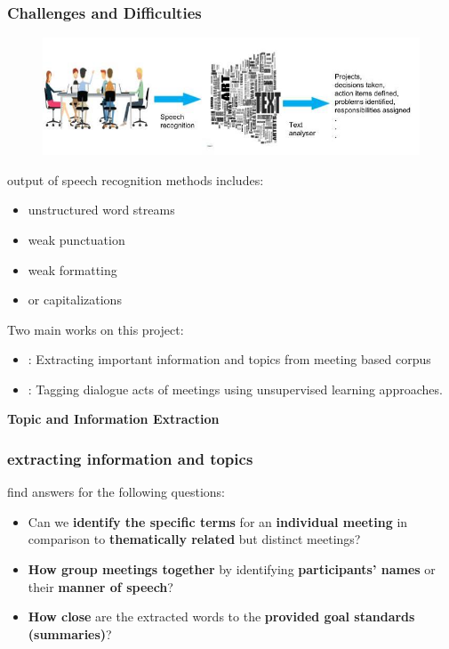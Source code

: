 \documentclass{beamer}
\newcommand{\imp}[1]{{\color{red}{#1}}}
\newcommand{\remark}[1]{{\color{blue}{#1}}}
\begin{document}
\begin{frame}\frametitle{Challenges and Difficulties} 
\begin{figure}
\includegraphics[width=12cm]{images/reus-image.jpg}
\end{figure}

output of speech recognition methods includes:
\begin{itemize}
\item  unstructured word streams
\item weak punctuation
\item weak formatting
\item or capitalizations
\end{itemize}


\end{frame}

\begin{frame}

Two main works on this project:
\begin{itemize}
	\item \remark{Topic and Information Extraction}: Extracting important information and topics from meeting based corpus
	\item \remark{Dialogue Act Tagging}: Tagging dialogue acts of meetings using unsupervised learning approaches. 
\end{itemize}

\end{frame}


\begin{frame}
\begin{center}
\textbf{Topic and Information Extraction}
\end{center}
\end{frame}


\begin{frame}\frametitle{extracting information and topics}

\imp{GOAL:} find answers for the following questions:
\begin{itemize}
\item Can we \textbf{identify the specific terms} for an \textbf{individual meeting} in comparison to \textbf{thematically related} but distinct meetings?
\item \textbf{How group meetings together} by identifying \textbf{participants' names} or their \textbf{manner of speech}?
\item \textbf{How close} are the extracted words to the \textbf{provided goal standards (summaries)}?
\end{itemize}

\end{frame} 
\end{document}
